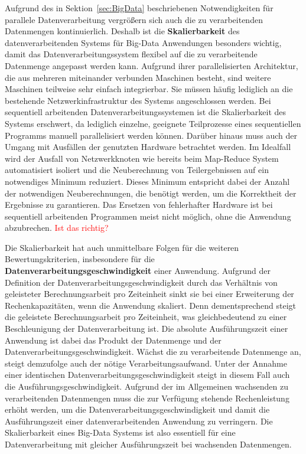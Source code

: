 Aufgrund des in Sektion~\ref{sec:BigData} beschriebenen Notwendigkeiten für parallele Datenverarbeitung vergrößern sich auch die zu verarbeitenden Datenmengen kontinuierlich. Deshalb ist die \textbf{Skalierbarkeit} des datenverarbeitenden Systems für Big-Data Anwendungen besonders wichtig, damit das Datenverarbeitungssystem flexibel auf die zu verarbeitende Datenmenge angepasst werden kann. Aufgrund ihrer parallelisierten Architektur, die aus mehreren miteinander verbunden Maschinen besteht, sind weitere Maschinen teilweise sehr einfach integrierbar. Sie müssen häufig lediglich an die bestehende Netzwerkinfrastruktur des Systems angeschlossen werden. Bei sequentiell arbeitenden Datenverarbeitungssystemen ist die Skalierbarkeit des Systems erschwert, da lediglich einzelne, geeignete Teilprozesse eines sequentiellen Programms manuell parallelisiert werden können. Darüber hinaus muss auch der Umgang mit Ausfällen der genutzten Hardware betrachtet werden. Im Idealfall wird der Ausfall von Netzwerkknoten wie bereits beim Map-Reduce System automatisiert isoliert und die Neuberechnung von Teilergebnissen auf ein notwendiges Minimum reduziert. Dieses Minimum entspricht dabei der Anzahl der notwendigen Neuberechnungen, die benötigt werden, um die Korrektheit der Ergebnisse zu garantieren. Das Ersetzen von fehlerhafter Hardware ist bei sequentiell arbeitenden Programmen meist nicht möglich, ohne die Anwendung abzubrechen. \textcolor{red}{Ist das richtig?}

Die Skalierbarkeit hat auch unmittelbare Folgen für die weiteren Bewertungskriterien, insbesondere für die \textbf{Datenverarbeitungsgeschwindigkeit} einer Anwendung. Aufgrund der Definition der Datenverarbeitungsgeschwindigkeit durch das Verhältnis von geleisteter Berechnungsarbeit pro Zeiteinheit sinkt sie bei einer Erweiterung der Rechenkapazitäten, wenn die Anwendung skaliert. Denn dementsprechend steigt die geleistete Berechnungsarbeit pro Zeiteinheit, was gleichbedeutend zu einer Beschleunigung der Datenverarbeitung ist. Die absolute Ausführungszeit einer Anwendung ist dabei das Produkt der Datenmenge und der Datenverarbeitungsgeschwindigkeit. Wächst die zu verarbeitende Datenmenge an, steigt demzufolge auch der nötige Verarbeitungsaufwand. Unter der Annahme einer identischen Datenverarbeitungsgeschwindigkeit steigt in diesem Fall auch die Ausführungsgeschwindigkeit. Aufgrund der im Allgemeinen wachsenden zu verarbeitenden Datenmengen muss die zur Verfügung stehende Rechenleistung erhöht werden, um die Datenverarbeitungsgeschwindigkeit und damit die Ausführungszeit einer datenverarbeitenden Anwendung zu verringern. Die Skalierbarkeit eines Big-Data Systems ist also essentiell für eine Datenverarbeitung mit gleicher Ausführungszeit bei wachsenden Datenmengen.

